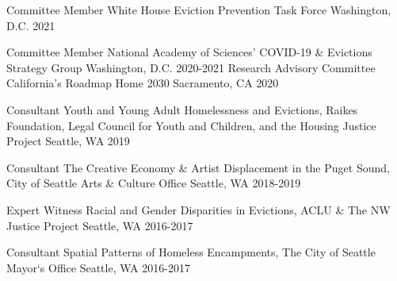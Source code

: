 \begin{cvhonors}

  \cvhonor
    {Committee Member} %
    {White House Eviction Prevention Task Force} %
    {Washington, D.C.} %
    {2021} %
    
  \cvhonor
    {Committee Member} %
    {National Academy of Sciences' COVID-19 \& Evictions Strategy Group} %
    {Washington, D.C.} %
    {2020-2021} %
  \cvhonor
    {Research Advisory Committee} %
    {California's Roadmap Home 2030} %
    {Sacramento, CA} %
    {2020} %
    
  \cvhonor
    {Consultant} %
    {Youth and Young Adult Homelessness and Evictions, Raikes Foundation, Legal Council for Youth and Children, and the Housing Justice Project} %
    {Seattle, WA} %
    {2019} %

  \cvhonor
    {Consultant} %
    {The Creative Economy \& Artist Displacement in the Puget Sound, City of Seattle Arts \& Culture Office} %
    {Seattle, WA} %
    {2018-2019} %

  \cvhonor
    {Expert Witness} %
    {Racial and Gender Disparities in Evictions, ACLU \& The NW Justice Project} %
    {Seattle, WA} %
    {2016-2017} %

  \cvhonor
    {Consultant} %
    {Spatial Patterns of Homeless Encampments, The City of Seattle Mayor‘s Office} %
    {Seattle, WA} %
    {2016-2017} %

\end{cvhonors}